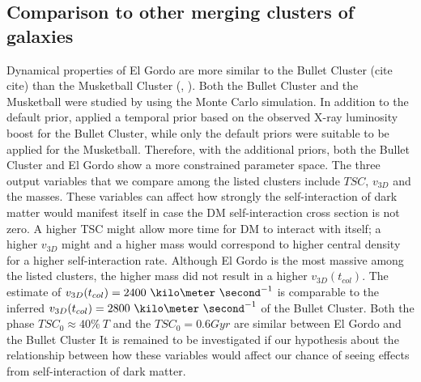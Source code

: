 \subsection{Comparison to other merging clusters of galaxies}
%
Dynamical properties of El Gordo are more similar to the Bullet Cluster
(cite cite)
than the Musketball Cluster (\cite{Dawson12}, ). Both the Bullet Cluster and the Musketball
were studied by  using the Monte Carlo simulation.
In addition to the default prior,  applied a temporal prior
based on the observed X-ray luminosity boost for the Bullet Cluster, while
only the default priors were suitable to be applied for the Musketball.
Therefore, with the additional priors, both the Bullet Cluster and El Gordo
show a more constrained parameter space. 
The three output variables that we compare among the listed clusters include $TSC$,
$v_{3D}$ and the masses. These variables can affect
how strongly the self-interaction of dark matter would manifest itself in
case the DM self-interaction cross section is not zero. A higher TSC might
allow more time for DM to interact with itself; a higher $v_{3D}$ might
 and a higher mass would correspond to
higher central density for a higher self-interaction rate. Although El
Gordo is the most massive among the listed clusters, the higher mass did not result in a higher $v_{3D}(t_{col})$.
The estimate of $v_{3D}(t_{col}) = 2400~\kilo\meter~\second^{-1}$ is
comparable to the inferred $v_{3D}(t_{col}) =
2800~\kilo\meter~\second^{-1}$ of the Bullet Cluster. 
Both the phase $TSC_0  \approx 40\%~T$ and the $TSC_0 = 0.6 Gyr$ are
similar between El Gordo and the Bullet Cluster
It is remained to be investigated if our hypothesis about the relationship
between how these variables would affect our chance of seeing effects from
self-interaction of dark matter. 

